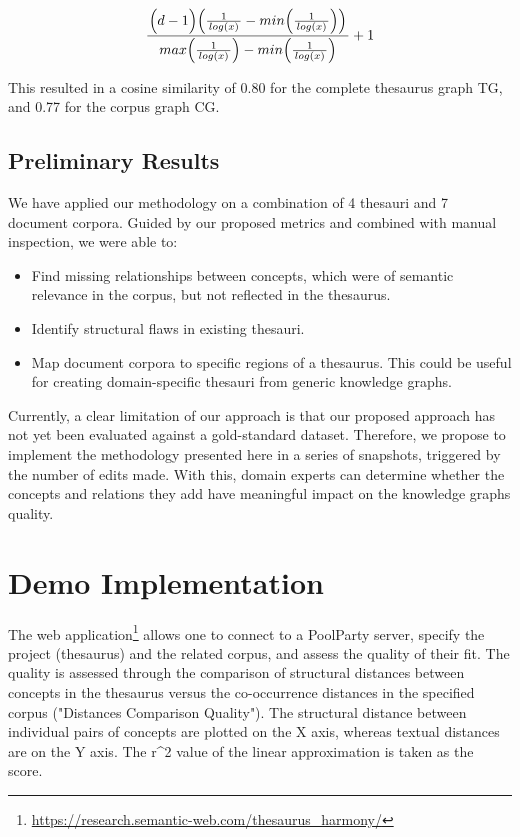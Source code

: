 \documentclass[runningheads,a4paper]{llncs}
\begin{document}
\begin{equation}
\let\par\empty {\frac{{\left.\middle(d-{1}\middle)\middle({\frac{{{1}}}{{\left.log{\mi{}}\middle(x\middle){\mi{}}\right.}}}-min\middle({\frac{{{1}}}{{\left.log\middle(x\middle)\right.}}}\middle)\middle)\right.}}{{\left.max{\mi{}}\middle({\frac{{{1}}}{{\left.log{\mi{}}\middle(x\middle){\mi{}}\right.}}}\middle){\mi{}}-min\middle({\frac{{{1}}}{{\left.log\middle(x\middle)\right.}}}\middle)\right.}}}+{1}
\label{}
\end{equation}


This resulted in a cosine similarity of 0.80 for the complete thesaurus graph TG, and 0.77 for the corpus graph CG.

\subsection{Preliminary Results}

We have applied our methodology on a combination of 4 thesauri and 7 document corpora. Guided by our proposed metrics and combined with manual inspection, we were able to: 
\begin{itemize}
\item Find missing relationships between concepts, which were of semantic relevance in the corpus, but not reflected in the thesaurus.
\item Identify structural flaws in existing thesauri.
\item Map document corpora to specific regions of a thesaurus. This could be useful for creating domain-specific thesauri from generic knowledge graphs.
\end{itemize}

Currently, a clear limitation of our approach is that our proposed approach has not yet been evaluated against a gold-standard dataset. Therefore, we propose to implement the methodology presented here in a series of snapshots, triggered by the number of edits made. With this, domain experts can determine whether the concepts and relations they add have meaningful impact on the knowledge graphs quality.

\section{Demo Implementation}

The web application\footnote{\url{https://research.semantic-web.com/thesaurus\_harmony/}} allows one to connect to a PoolParty server, specify the project (thesaurus) and the related corpus, and assess the quality of their fit. The quality is assessed through the comparison of structural distances between concepts in the thesaurus versus the co-occurrence distances in the specified corpus ("Distances Comparison Quality"). The structural distance between individual pairs of concepts are plotted on the X axis, whereas textual distances are on the Y axis. The r\textasciicircum2 value of the linear approximation is taken as the score.
\end{document}
